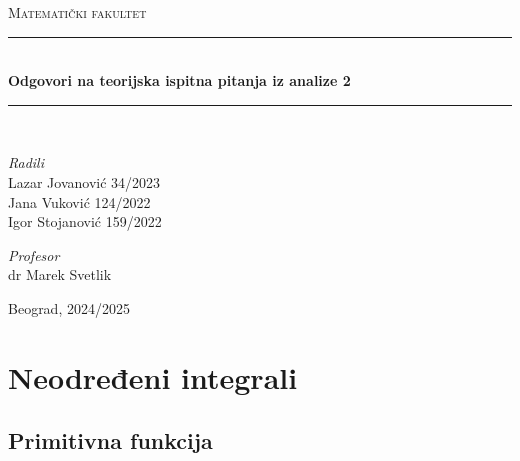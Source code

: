 \documentclass{article}
\begin{document}
\begin{titlepage}

    \newcommand{\HRule}{\rule{\linewidth}{0.4mm}}
    \center
    \textsc{\LARGE Matematički fakultet}\\[5cm]

    \HRule\\[0.4cm]
    {\LARGE\bfseries Odgovori na teorijska ispitna pitanja iz analize 2}
    \\[0.2cm]
    \HRule\\[2cm]

    \vspace{17\baselineskip}
    \begin{minipage}[t]{0.4\textwidth}
        \begin{flushleft}
            \large
            \textit{Radili}\\
            Lazar Jovanović 34/2023\\
            Jana Vuković 124/2022\\
            Igor Stojanović 159/2022
        \end{flushleft}
    \end{minipage}
    \hspace*{1cm}
    \begin{minipage}[t]{0.4\textwidth}
        \begin{flushright}
            \large
            \textit{Profesor}\\
            dr Marek Svetlik
        \end{flushright}
    \end{minipage}

    \vfill\vfill\vfill\vfill
    {\large Beograd, 2024/2025}
    \vfill

\end{titlepage}

\renewcommand{\contentsname}{Sadržaj}
\tableofcontents

\newpage

\section{Neodređeni integrali}
\subsection{Primitivna funkcija}
\end{document}
